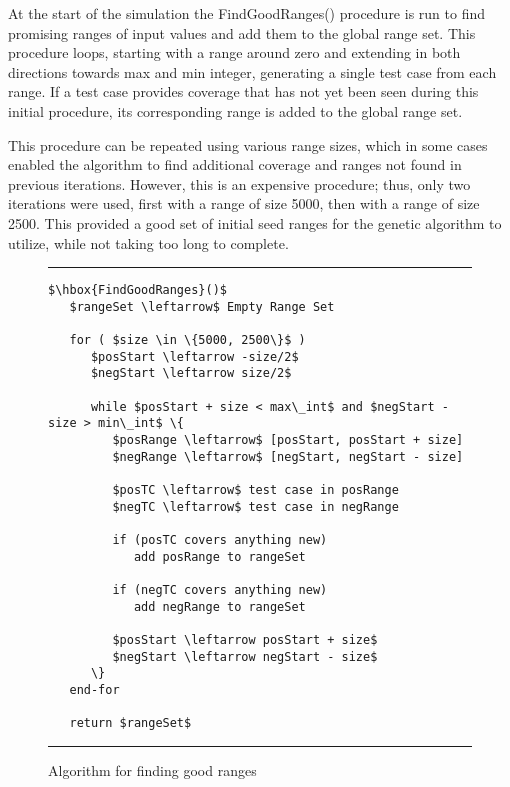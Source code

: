 \documentclass[runningheads]{llncs}
\begin{document}
At the start of the simulation the FindGoodRanges() procedure is run to find promising ranges of input values and add them to the global range set. This procedure loops, starting with a range around zero and extending in both directions towards max and min integer, generating a single test case from each range. If a test case provides coverage that has not yet been seen during this initial procedure, its corresponding range is added to the global range set. 

This procedure can be repeated using various range sizes, which in some cases enabled the algorithm to find additional coverage and ranges not found in previous iterations. However, this is an expensive procedure; thus, only two iterations were used, first with a range of size 5000, then with a range of size 2500. This provided a good set of initial seed ranges for the genetic algorithm to utilize, while not taking too long to complete.


\begin{figure}[h!]
\begin{center}
\hrule
\medskip
\begin{Verbatim}[fontfamily=tt, xleftmargin=10pt, commandchars=\\\{\},
codes={\catcode`$=3\catcode`^=7\catcode`_=8}]
$\hbox{FindGoodRanges}()$  
   $rangeSet \leftarrow$ Empty Range Set
		
   for ( $size \in \{5000, 2500\}$ ) 
      $posStart \leftarrow -size/2$
      $negStart \leftarrow size/2$
		
      while $posStart + size < max\_int$ and $negStart - size > min\_int$ \{
         $posRange \leftarrow$ [posStart, posStart + size]
         $negRange \leftarrow$ [negStart, negStart - size]
		
         $posTC \leftarrow$ test case in posRange
         $negTC \leftarrow$ test case in negRange
		
         if (posTC covers anything new)
            add posRange to rangeSet
		
         if (negTC covers anything new)
            add negRange to rangeSet
		
         $posStart \leftarrow posStart + size$
         $negStart \leftarrow negStart - size$
      \}
   end-for
		
   return $rangeSet$
\end{Verbatim}
\hrule
\end{center}
\caption{Algorithm for finding good ranges \label{fig:ranges}}
\end{figure}
\FloatBarrier
\end{document}
